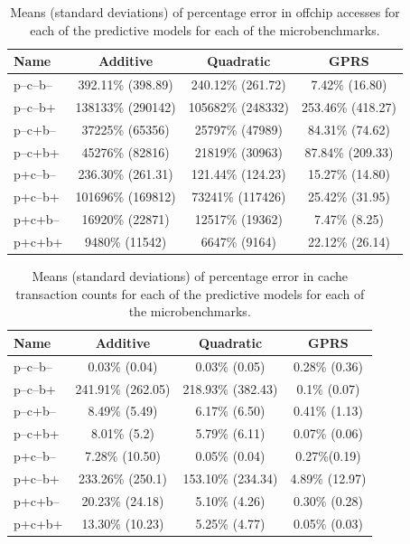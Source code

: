 \begin{table}
\scriptsize
\begin{tabular}{|l|c|c|c|}
\hline
Name & Additive & Quadratic & GPRS \\ \hline
  p--c--b-- & 392.11\% (398.89) &  240.12\% (261.72) & 7.42\% (16.80)  \\ \hline
 p--c--b+ &  138133\% (290142)&  105682\% (248332) &  253.46\% (418.27)  \\ \hline
 p--c+b-- &   37225\% (65356) &  25797\% (47989) & 84.31\% (74.62)  \\ \hline
 p--c+b+ &   45276\% (82816) &  21819\% (30963) &  87.84\% (209.33)  \\ \hline
 p+c--b-- & 236.30\% (261.31) &  121.44\% (124.23) & 15.27\% (14.80)    \\ \hline
 p+c--b+ &   101696\% (169812)  &  73241\% (117426) & 25.42\% (31.95) \\ \hline
 p+c+b--&  16920\% (22871)&   12517\% (19362) & 7.47\% (8.25)  \\ \hline
 p+c+b+&   9480\% (11542) &  6647\% (9164) &  22.12\% (26.14)  \\ \hline
  \end{tabular}
 \caption{Means (standard deviations) of percentage error in offchip accesses for each of the predictive models for each of the microbenchmarks.}
\label{table:acc-offchip}
\end{table}

\begin{table}
\small
\begin{tabular}{|l|c|c|c|}
\hline
Name & Additive & Quadratic & GPRS \\ \hline
 p--c--b-- & 0.03\% (0.04) & 0.03\% (0.05) & 0.28\% (0.36) \\ \hline
 p--c--b+ & 241.91\% (262.05)  & 218.93\% (382.43) &  0.1\% (0.07) \\ \hline
 p--c+b-- & 8.49\% (5.49) & 6.17\% (6.50) & 0.41\% (1.13) \\ \hline
 p--c+b+ & 8.01\% (5.2)  & 5.79\% (6.11) & 0.07\% (0.06) \\ \hline
 p+c--b-- & 7.28\% (10.50)  & 0.05\% (0.04) & 0.27\%(0.19) \\ \hline
 p+c--b+ & 233.26\% (250.1) & 153.10\% (234.34) &  4.89\% (12.97)\\ \hline
 p+c+b-- & 20.23\% (24.18)  & 5.10\% (4.26) &  0.30\% (0.28) \\ \hline
 p+c+b+ & 13.30\% (10.23)  & 5.25\% (4.77)  & 0.05\% (0.03) \\ \hline
  \end{tabular}
 \caption{Means (standard deviations) of percentage error in cache transaction counts for each of the predictive models for each of the microbenchmarks.}
\label{table:acc-cache}
\end{table}

